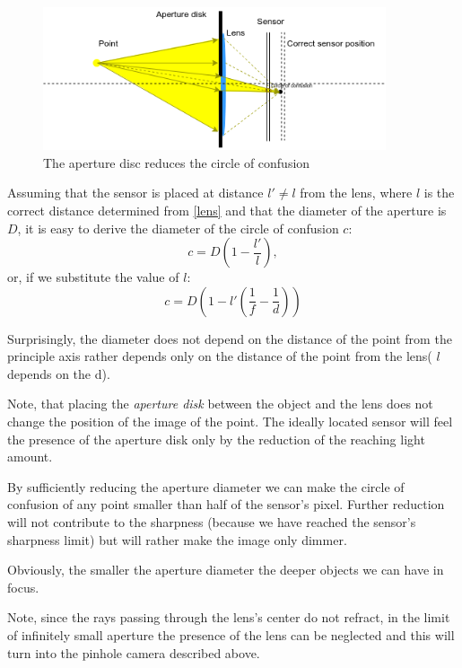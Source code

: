 \documentclass[a4paper,10pt]{article}
\begin{document}
\begin{figure}[h]
\centering
 \includegraphics[width=0.9\textwidth]{../../images/lens_confusion_circle_aperture.png}
 \caption{The aperture disc reduces the circle of confusion }
 \label{fig:lens_aperture}
\end{figure}

Assuming that the sensor is placed at distance $l'\neq l$ from the lens, where $l$ is the correct distance determined from \eqref{lens} and that the diameter of the aperture is $D$, it is easy to derive the diameter of the circle of confusion $c$:
\begin{equation}
c = D\left(1-\frac{l'}{l}\right),
\end{equation} 
or, if we substitute the value of $l$:
\begin{equation}
c=D\left(1 -l' \left(\frac{1}{f} - \frac{1}{d}\right )\right )
\label{conf_circ_expanded}
\end{equation} 

Surprisingly,  the diameter does not depend on the distance of the point from the principle axis rather depends only on the distance of the point from the lens( $l$ depends on the d).  

Note, that placing the {\it aperture disk} between the object and the lens does not change the position of the image of the point. The ideally located sensor will feel the presence of the aperture disk only by the reduction of the reaching light amount. 

By sufficiently reducing the aperture diameter we can make the circle of confusion of any point smaller than half of the sensor's pixel. Further reduction will not contribute to the sharpness (because we have reached the sensor's sharpness limit) but will rather make the image only dimmer.

Obviously, the smaller the aperture diameter the deeper objects we can have in focus. 

Note, since the rays passing through the lens's center do not refract, in the limit of infinitely small aperture the presence of the lens can be neglected and this will turn into the pinhole camera described above. 
\end{document}
